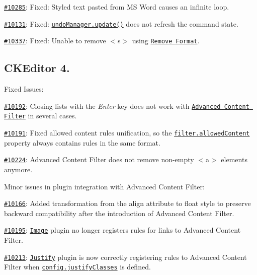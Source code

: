 {\begin{DoxyItemize}
\item \href{http://dev.ckeditor.com/ticket/10285}{\tt \#10285}\+: Fixed\+: Styled text pasted from MS Word causes an infinite loop.
\item \href{http://dev.ckeditor.com/ticket/10131}{\tt \#10131}\+: Fixed\+: \href{http://docs.ckeditor.com/#!/api/CKEDITOR.plugins.undo.UndoManager-method-update}{\tt {\ttfamily undo\+Manager.\+update()}} does not refresh the command state.
\item \href{http://dev.ckeditor.com/ticket/10337}{\tt \#10337}\+: Fixed\+: Unable to remove {\ttfamily $<$s$>$} using \href{http://ckeditor.com/addon/removeformat}{\tt Remove Format}.
\end{DoxyItemize}}

{\ttfamily \subsection*{C\+K\+Editor 4.}}

{\ttfamily }

{\ttfamily Fixed Issues\+:}

{\ttfamily 
\begin{DoxyItemize}
\item \href{http://dev.ckeditor.com/ticket/10192}{\tt \#10192}\+: Closing lists with the {\itshape Enter} key does not work with \href{http://docs.ckeditor.com/#!/guide/dev_advanced_content_filter}{\tt Advanced Content Filter} in several cases.
\item \href{http://dev.ckeditor.com/ticket/10191}{\tt \#10191}\+: Fixed allowed content rules unification, so the \href{http://docs.ckeditor.com/#!/api/CKEDITOR.filter-property-allowedContent}{\tt {\ttfamily filter.\+allowed\+Content}} property always contains rules in the same format.
\item \href{http://dev.ckeditor.com/ticket/10224}{\tt \#10224}\+: Advanced Content Filter does not remove non-\/empty {\ttfamily $<$a$>$} elements anymore.
\item Minor issues in plugin integration with Advanced Content Filter\+:
\begin{DoxyItemize}
\item \href{http://dev.ckeditor.com/ticket/10166}{\tt \#10166}\+: Added transformation from the {\ttfamily align} attribute to {\ttfamily float} style to preserve backward compatibility after the introduction of Advanced Content Filter.
\item \href{http://dev.ckeditor.com/ticket/10195}{\tt \#10195}\+: \href{http://ckeditor.com/addon/image}{\tt Image} plugin no longer registers rules for links to Advanced Content Filter.
\item \href{http://dev.ckeditor.com/ticket/10213}{\tt \#10213}\+: \href{http://ckeditor.com/addon/justify}{\tt Justify} plugin is now correctly registering rules to Advanced Content Filter when \href{http://docs.ckeditor.com/#!/api/CKEDITOR.config-cfg-justifyClasses}{\tt {\ttfamily config.\+justify\+Classes}} is defined.
\end{DoxyItemize}
\end{DoxyItemize}}

